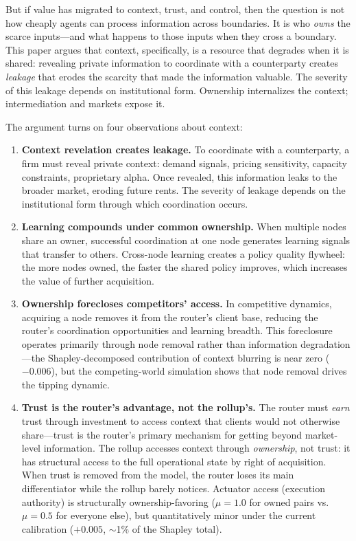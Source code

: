 \documentclass[12pt]{article}
\theoremstyle{definition}
\begin{document}
But if value has migrated to context, trust, and control, then the question is not how cheaply agents can process information across boundaries. It is who \textit{owns} the scarce inputs---and what happens to those inputs when they cross a boundary. This paper argues that context, specifically, is a resource that degrades when it is shared: revealing private information to coordinate with a counterparty creates \textit{leakage} that erodes the scarcity that made the information valuable. The severity of this leakage depends on institutional form. Ownership internalizes the context; intermediation and markets expose it.

The argument turns on four observations about context:

\begin{enumerate}[leftmargin=*]
\item \textbf{Context revelation creates leakage.} To coordinate with a counterparty, a firm must reveal private context: demand signals, pricing sensitivity, capacity constraints, proprietary alpha. Once revealed, this information leaks to the broader market, eroding future rents. The severity of leakage depends on the institutional form through which coordination occurs.

\item \textbf{Learning compounds under common ownership.} When multiple nodes share an owner, successful coordination at one node generates learning signals that transfer to others. Cross-node learning creates a policy quality flywheel: the more nodes owned, the faster the shared policy improves, which increases the value of further acquisition.

\item \textbf{Ownership forecloses competitors' access.} In competitive dynamics, acquiring a node removes it from the router's client base, reducing the router's coordination opportunities and learning breadth. This foreclosure operates primarily through node removal rather than information degradation---the Shapley-decomposed contribution of context blurring is near zero ($-0.006$), but the competing-world simulation shows that node removal drives the tipping dynamic.

\item \textbf{Trust is the router's advantage, not the rollup's.} The router must \textit{earn} trust through investment to access context that clients would not otherwise share---trust is the router's primary mechanism for getting beyond market-level information. The rollup accesses context through \textit{ownership}, not trust: it has structural access to the full operational state by right of acquisition. When trust is removed from the model, the router loses its main differentiator while the rollup barely notices. Actuator access (execution authority) is structurally ownership-favoring ($\mu = 1.0$ for owned pairs vs.\ $\mu = 0.5$ for everyone else), but quantitatively minor under the current calibration ($+0.005$, $\sim$1\% of the Shapley total).
\end{enumerate}
\end{document}
